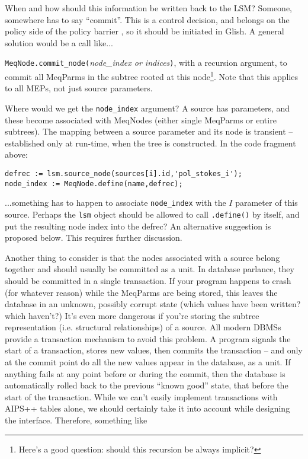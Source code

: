 \documentclass[]{lofar}
\begin{document}
  When and how should this information be written back to the LSM? Someone,
  somewhere has to say ``commit''. This is a control decision, and belongs on the
  policy side of the policy barrier \cite{PSS4}, so it should be initiated in
  Glish. A general solution would be a call like...
  
  {\tt MeqNode.commit\_node(}{\em node\_index or indices}{\tt)}, with a recursion 
  argument, to commit all MeqParms in the subtree rooted at this
  node\footnote{Here's a good question: should this recursion be always
  implicit?}. Note that this applies to all MEPs, not just source parameters.
  
  Where would we get the {\tt node\_index} argument? A source has parameters, and
  these become associated with MeqNodes (either single MeqParms or entire
  subtrees). The mapping between a source parameter and its node is transient --
  established only at run-time, when the tree is constructed. In the code
  fragment above:
  
\begin{verbatim}
defrec := lsm.source_node(sources[i].id,'pol_stokes_i');
node_index := MeqNode.define(name,defrec);
\end{verbatim}
  
  ...something has to happen to associate {\tt node\_index} with the $I$
  parameter of this source. Perhaps the {\tt lsm} object should be allowed to call
  {\tt .define()} by itself, and put the resulting node index into the defrec?
  An alternative suggestion is proposed below. This requires further discussion.
  
  Another thing to consider is that the nodes associated with a source belong
  together and should usually be committed as a unit. In database parlance, they
  should be committed in a single transaction. If your program happens to crash
  (for whatever reason) while the MeqParms are being stored, this leaves the
  database in an unknown, possibly corrupt state (which values have been written?
  which haven't?) It's even more dangerous if you're storing the subtree
  representation (i.e. structural relationships) of a source. All modern DBMSs
  provide a transaction mechanism to avoid this problem. A program signals the
  start of a transaction, stores new values, then commits the transaction -- and
  only at the commit point do all the new values appear in the database, as a
  unit. If anything fails at any point before or during the commit, then the
  database is automatically rolled back to the previous ``known good'' state,
  that before the start of the transaction. While we can't easily implement
  transactions with AIPS++ tables alone, we should certainly take it into account
  while designing the interface. Therefore, something like
  
\end{document}

